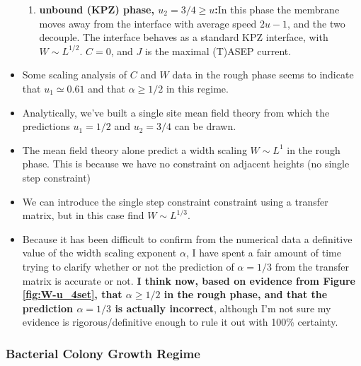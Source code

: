 \documentclass[a4paper,10pt]{article}
\newcommand{\fref}[1]{Figure \ref{#1}}
\begin{document}
\begin{itemize}
\begin{enumerate}
   \item {\bf unbound (KPZ) phase, $u_2 = 3/4 \ge u$:}\newline In this phase the membrane moves away from the interface with average speed $2u-1$, and the two decouple. The interface behaves as a standard KPZ interface, with $W \sim L^{1/2}$. $C=0$, and $J$ is the maximal (T)ASEP current.
  \end{enumerate}
 \item Some scaling analysis of $C$ and $W$ data in the rough phase seems to indicate that $u_1 \simeq 0.61$ and that $\alpha \ge 1/2$ in this regime.
 \item Analytically, we've built a single site mean field theory from which the predictions $u_1 = 1/2$ and $u_2 = 3/4$ can be drawn.
 \item The mean field theory alone predict a width scaling $W\sim L^1$ in the rough phase. This is because we have no constraint on adjacent heights (no single step constraint)
 \item We can introduce the single step constraint constraint using a transfer matrix, but in this case find $W \sim L^{1/3}$.
 \item Because it has been difficult to confirm from the numerical data a definitive value of the width scaling exponent $\alpha$, I have spent a fair amount of time trying to clarify whether or not the prediction of $\alpha = 1/3$ from the transfer matrix is accurate or not. {\bf I think now, based on evidence from \fref{fig:W-u_4set}, that $\alpha \ge 1/2$ in the rough phase, and that the prediction $\alpha = 1/3$ is actually incorrect}, although I'm not sure my evidence is rigorous/definitive enough to rule it out with 100\% certainty. 
\end{itemize}

\subsubsection*{Bacterial Colony Growth Regime}
\end{document}

